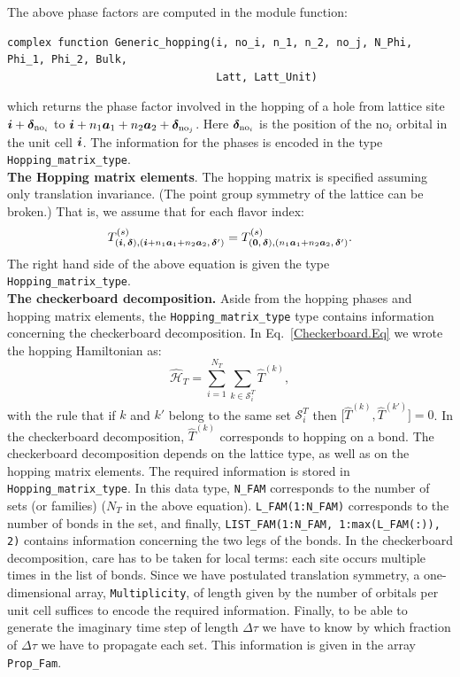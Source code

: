 The above phase factors are computed  in the   module function: 
\begin{lstlisting}[style=fortran]
complex function Generic_hopping(i, no_i, n_1, n_2, no_j, N_Phi, Phi_1, Phi_2, Bulk, 
                                 Latt, Latt_Unit)
\end{lstlisting}
which returns the  phase factor involved in the hopping of a hole from lattice site $ \boldsymbol{i} + \boldsymbol{\delta}_{\text{no}_i} $ to 
$\boldsymbol{i} + n_1 \boldsymbol{a}_1 + n_2 \boldsymbol{a}_2+ \boldsymbol{\delta}_{\text{no}_j}  $.  Here  $\boldsymbol{\delta}_{\text{no}_i}$  is  the position of the $\text{no}_i$  orbital in the unit cell
$\boldsymbol{i}$. 
The information for the phases is encoded in the type \texttt{Hopping\_matrix\_type}.\\

\noindent
\textbf{The  Hopping matrix elements}. 
The hopping matrix  is specified assuming only translation invariance.  (The point group symmetry of the lattice can be broken.)
That is, we assume that  for  each flavor index:
\begin{equation} 
T_{(\boldsymbol{i},\,\boldsymbol{\delta}), (\boldsymbol{i} +  n_1\boldsymbol{a}_1  + n_2 \boldsymbol{a}_2,\,\boldsymbol{\delta}')}^{(s)}   =   T^{(s)}_{(\boldsymbol{0},\,\boldsymbol{\delta}),  (n_1\boldsymbol{a}_1  + n_2 \boldsymbol{a}_2,\,\boldsymbol{\delta}') }.
\label{eq:hop}	 
\end{equation}
The right  hand side of the above equation is given  the type  \texttt{Hopping\_matrix\_type}.\\


\noindent
\textbf{The checkerboard decomposition.}   Aside from the hopping phases and hopping matrix elements, the \texttt{Hopping\_matrix\_type} type contains information  concerning the checkerboard   decomposition.  In Eq.~\eqref{Checkerboard.Eq} we wrote the hopping Hamiltonian as:
\begin{equation}
\hat{\mathcal{H}}_{T}     = \sum_{i=1}^{N_T} \sum_{k \in \mathcal{S}^{T}_i} \hat{T}^{(k)},  
\end{equation}
with the rule that  if $k$ and $k'$  belong to the same set $\mathcal{S}^{T}_i $ then   $ \big[ \hat{T}^{(k)} , \hat{T}^{(k')} \big] = 0 $.  In the checkerboard decomposition, $\hat{T}^{(k)}$   corresponds to  hopping on a bond.    The checkerboard decomposition depends on the   lattice type, as well as on the hopping matrix elements.   The required  information is stored in  \texttt{Hopping\_matrix\_type}. In this data type,  \texttt{N\_FAM}  corresponds to the number of sets  (or families) ($N_T$ in the above equation). \texttt{L\_FAM(1:N\_FAM)}   corresponds to the number of bonds in the set,  and finally,  \texttt{LIST\_FAM(1:N\_FAM, 1:max(L\_FAM(:)), 2)}    contains  information concerning the two legs of the bonds.    In the checkerboard decomposition, care has to be taken for local terms: each site  occurs multiple times in the list of bonds.    Since we have postulated translation symmetry,    a one-dimensional array, \texttt{Multiplicity},  of length  given by  the number of orbitals per unit cell suffices to  encode the required information.  
Finally, to be able to generate  the imaginary time step of length $\Delta \tau$  we  have to know   by which fraction of  $\Delta \tau$   we have to propagate each set.  This information is given in  the array  \texttt{Prop\_Fam}.  

